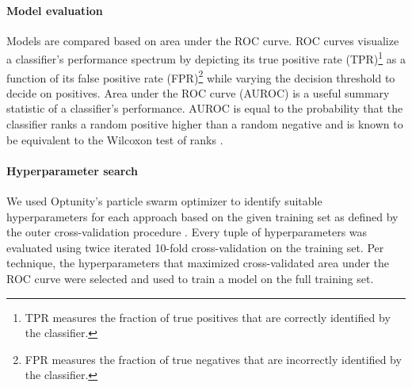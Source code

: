 \paragraph{Model evaluation}
Models are compared based on area under the ROC curve. ROC curves visualize a classifier's performance spectrum by depicting its true positive rate (TPR)\footnote{TPR measures the fraction of true positives that are correctly identified by the classifier.} as a function of its false positive rate (FPR)\footnote{FPR measures the fraction of true negatives that are incorrectly identified by the classifier.} while varying the decision threshold to decide on positives. Area under the ROC curve (AUROC) is a useful summary statistic of a classifier's performance. AUROC is equal to the probability that the classifier ranks a random positive higher than a random negative and is known to be equivalent to the Wilcoxon test of ranks \citep{hanley1982meaning}.

\paragraph{Hyperparameter search} 
We used Optunity's particle swarm optimizer to identify suitable hyperparameters for each approach based on the given training set as defined by the outer cross-validation procedure \citep{claesen2014easy}. Every tuple of hyperparameters was evaluated using twice iterated 10-fold cross-validation on the training set. Per technique, the hyperparameters that maximized cross-validated area under the ROC curve were selected and used to train a model on the full training set.

